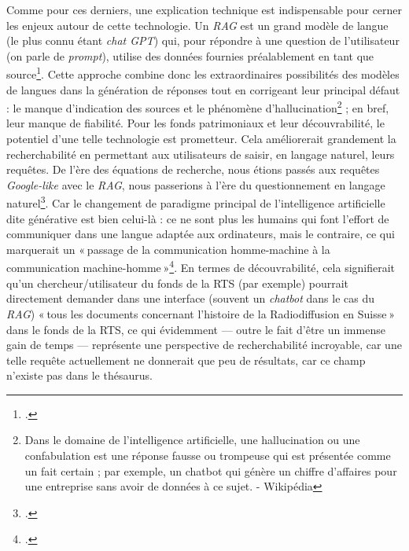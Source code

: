 Comme pour ces derniers, une explication technique est indispensable pour cerner les enjeux autour de cette technologie. Un \textit{RAG} est un grand modèle de langue (le plus connu étant \textit{chat GPT}) qui, pour répondre à une question de l’utilisateur (on parle de \textit{prompt}), utilise des données fournies préalablement en tant que source\footcite{pouyllau_quels_2024}. Cette approche combine donc les extraordinaires possibilités des modèles de langues dans la génération de réponses tout en corrigeant leur principal défaut : le manque d’indication des sources et le phénomène d’hallucination\footnote{Dans le domaine de l'intelligence artificielle, une hallucination ou une confabulation est une réponse fausse ou trompeuse qui est présentée comme un fait certain ; par exemple, un chatbot qui génère un chiffre d'affaires pour une entreprise sans avoir de données à ce sujet. - Wikipédia} ; en bref, leur manque de fiabilité. Pour les fonds patrimoniaux et leur découvrabilité, le potentiel d’une telle technologie est prometteur. Cela améliorerait grandement la recherchabilité en permettant aux utilisateurs de saisir, en langage naturel, leurs requêtes. De l’ère des équations de recherche, nous étions passés aux requêtes \textit{Google-like} avec le \textit{RAG}, nous passerions à l’ère du questionnement en langage naturel\footcite{bermes_futur_2024}. Car le changement de paradigme principal de l’intelligence artificielle dite générative est bien celui-là : ce ne sont plus les humains qui font l’effort de communiquer dans une langue adaptée aux ordinateurs, mais le contraire, ce qui marquerait un « passage de la communication homme-machine à la communication machine-homme »\footcite[p. 7]{pillaud_et_2024}. En termes de découvrabilité, cela signifierait qu’un chercheur/utilisateur du fonds de la RTS (par exemple) pourrait directement demander dans une interface (souvent un \textit{chatbot} dans le cas du \textit{RAG}) « tous les documents concernant l’histoire de la Radiodiffusion en Suisse » dans le fonds de la RTS, ce qui évidemment — outre le fait d’être un immense gain de temps — représente une perspective de recherchabilité incroyable, car une telle requête actuellement ne donnerait que peu de résultats, car ce champ n’existe pas dans le thésaurus.


